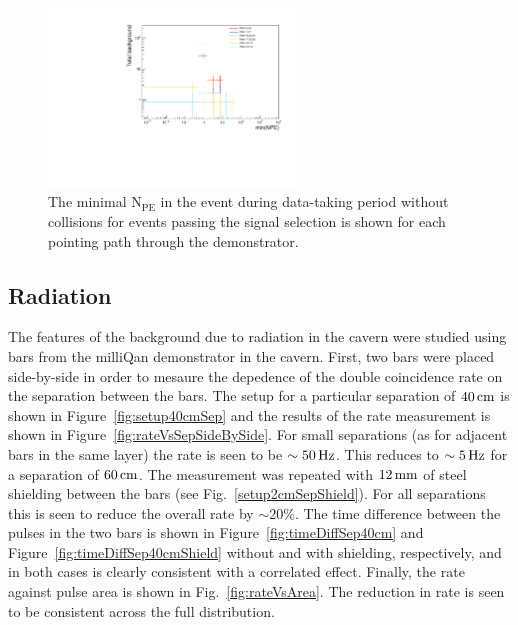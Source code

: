 \documentclass[12pt]{article}
\newcommand{\unit}[1]{\ensuremath{\text{\,#1}}\xspace}
\newcommand{\npe} {\mbox{\ensuremath{\textrm{N}_\textrm{PE}}}\xspace}
\begin{document}

\begin{figure}[ht!]
    \centering
    \includegraphics[width=0.6\textwidth]{figures/perPathPlotsNoBeam.pdf}
    \caption{\label{fig:perPathPlot} The minimal \npe in the event during data-taking period without
    collisions for events passing the signal selection is shown for each pointing path 
    through the demonstrator.}
\end{figure}

\subsection{Radiation}

The features of the background due to radiation in the cavern were studied
using bars from the milliQan demonstrator in the cavern. First, two bars
were placed side-by-side in order to mesaure the depedence of the 
double coincidence rate on the separation between the bars. The setup
for a particular separation of $40\unit{cm}$ is shown in Figure~\ref{fig:setup40cmSep}
and the results of the rate measurement is shown in Figure~\ref{fig:rateVsSepSideBySide}.
For small separations (as for adjacent bars in the same layer)
the rate is seen to be $\sim 50 \unit{Hz}$. This reduces to 
$\sim 5 \unit{Hz}$ for a separation of $60\unit{cm}$. The measurement was
repeated with $12\unit{mm}$ of steel shielding between the bars (see Fig.~\ref{setup2cmSepShield}). 
For all separations this is seen to reduce the overall rate by $\sim 20\%$.
The time difference between the pulses in the two bars is shown in Figure~\ref{fig:timeDiffSep40cm} and
Figure~\ref{fig:timeDiffSep40cmShield} without and with shielding, respectively,
and in both cases is clearly consistent with a correlated effect. Finally, 
the rate against pulse area is shown in Fig.~\ref{fig:rateVsArea}. The reduction in 
rate is seen to be consistent across the full distribution.
\end{document}
